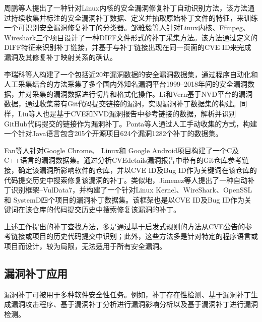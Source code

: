周鹏等人\cite{9周鹏2022一种}提出了一种针对Linux内核的安全漏洞修复补丁自动识别方法，该方法通过持续收集并标注的安全漏洞补丁数据、定义并抽取原始补丁文件的特征，来训练一个可识别安全漏洞修复补丁的分类器。邹雅毅等人\cite{7邹雅毅2016开源软件漏洞补丁的采集与整理}针对Linux内核、Ffmpeg、Wireshark三个项目设计了一种DIFF文件形式的补丁采集方法。该方法通过定义的DIFF特征来识别补丁链接，并基于与补丁链接出现在同一页面的CVE ID来完成漏洞及其修复补丁映射关系的确认。

李瑞科等人\cite{10李瑞科20191999}构建了一个包括近20年漏洞数据的安全漏洞数据集，通过程序自动化和人工采集结合的方法采集了多个国内外知名漏洞平台1999–2018年间的安全漏洞数据，并对采集的漏洞数据进行切片和格式化操作。Li和Vern\cite{li2017large}基于NVD平台的漏洞数据，通过收集带有Git代码提交链接的漏洞，实现漏洞补丁数据集的构建。同样，Liu等人\cite{liu2020large}也是基于CVE和NVD漏洞报告中参考链接的数据，解析并识别GitHub代码提交的链接作为漏洞补丁。Ponta等人\cite{ponta2019manually}通过人工手动收集的方式，构建一个针对Java语言包含205个开源项目624个漏洞1282个补丁的数据集。

Fan等人\cite{fan2020ac}针对Google Chrome、 Linux和 Google Android项目构建了一个C及C++语言的漏洞数据集。通过分析CVEdetails漏洞报告中带有的Git仓库参考链接，确定该漏洞所影响软件的仓库，并以CVE ID及Bug ID作为关键词在该仓库的代码提交历史中搜索修复该漏洞的补丁。类似地，Jimenez等人\cite{jimenez2018enabling}提出了一种自动补丁识别框架--VulData7，并构建了一个针对Linux Kernel、WireShark、OpenSSL和 SystemD四个项目的漏洞补丁数据集。该框架也是以CVE ID及Bug ID作为关键词在该仓库的代码提交历史中搜索修复该漏洞的补丁。

上述工作提出的补丁查找方法，多是通过基于启发式规则的方法从CVE公告的参考链接或项目的历史代码提交中识别；此外，这些方法多是针对特定的程序语言或项目而设计，较为局限，无法适用于所有安全漏洞。


\subsection{漏洞补丁应用}
漏洞补丁可被用于多种软件安全性任务。例如，补丁存在性检测\cite{8文琪2020}、基于漏洞补丁生成漏洞攻击程序\cite{brumley2008automatic,you2017semfuzz}、基于漏洞补丁分析进行漏洞影响分析\cite{4李舟军2015软件安全漏洞检测技术,5李韵2020基于机器学习的软件漏洞挖掘方法综述,pashchenko2018vulnerable,ponta2020detection,pashchenko2020vuln4real,Wang2020empirical}以及基于漏洞补丁进行漏洞检测\cite{li2016vulpecker,li2018vuldeepecker,zhou2019devign,jimenez2019importance}。%

